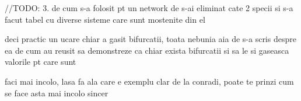 \hfill\break
\hfill\break
\hfill\break
//TODO: 3. de cum s-a folosit pt un network de s-ai eliminat cate 2 specii si s-a facut tabel cu diverse sisteme care sunt mostenite din el

deci practic un ucare chiar a gasit bifurcatii, toata nebunia aia de s-a scris despre ea de cum au reusit sa demonstreze ca chiar exista bifurcatii si sa le si gaseasca valorile pt care sunt

faci mai incolo, lasa fa ala care e exemplu clar de la conradi, poate te prinzi cum se face asta mai incolo sincer
\hfill\break
